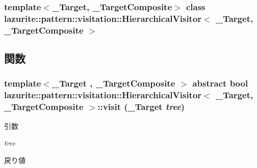 \subsubsection*{template$<$\_\-Target, \_\-TargetComposite$>$ class lazurite::pattern::visitation::HierarchicalVisitor$<$ \_\-Target, \_\-TargetComposite $>$}



\subsection{関数}
\hypertarget{classlazurite_1_1pattern_1_1visitation_1_1_hierarchical_visitor_3_01___target_00_01___target_composite_01_4_a34aa080c5269d28a0f8f0a14ff40c1db}{
\subsubsection[{visit}]{\setlength{\rightskip}{0pt plus 5cm}template$<$\_\-Target , \_\-TargetComposite $>$ abstract bool lazurite::pattern::visitation::HierarchicalVisitor$<$ \_\-Target, \_\-TargetComposite $>$::visit (\_\-Target {\em tree})}}
\label{classlazurite_1_1pattern_1_1visitation_1_1_hierarchical_visitor_3_01___target_00_01___target_composite_01_4_a34aa080c5269d28a0f8f0a14ff40c1db}

\begin{DoxyParams}{引数}
\item[{\em tree}]\end{DoxyParams}
\begin{DoxyReturn}{戻り値}

\end{DoxyReturn}


